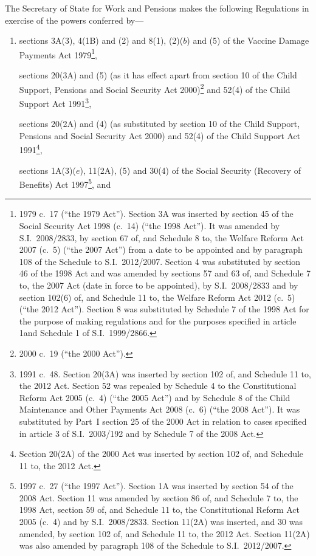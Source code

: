 \documentclass[12pt,a4paper]{article}
\title{\regstitle}
\author{S.I.\ 2013 No.\ 2380}
\date{Made
10th September 2013\\
Coming into force
28th October 2013
}
\begin{document}
\maketitle

\enlargethispage{\baselineskip}

\noindent
The Secretary of State for Work and Pensions makes the following Regulations in exercise of the powers conferred by—
\begin{enumerate}\item[]
    sections 3A(3), 4(1B) and (2) and 8(1), (2)($b$)  and (5) of the Vaccine Damage Payments Act 1979\footnote{1979 c.~17 (“the 1979 Act”). Section 3A was inserted by section 45 of the Social Security Act 1998 (c.~14) (“the 1998 Act”). It was amended by S.I.~2008/2833, by section 67 of, and Schedule 8 to, the Welfare Reform Act 2007 (c.~5) (“the 2007 Act”) from a date to be appointed and by paragraph 108 of the Schedule to S.I.~2012/2007. Section 4 was substituted by section 46 of the 1998 Act and was amended by sections 57 and 63 of, and Schedule 7 to, the 2007 Act (date in force to be appointed), by S.I.~2008/2833 and by section 102(6) of, and Schedule 11 to, the Welfare Reform Act 2012 (c.~5) (“the 2012 Act”). Section 8 was substituted by Schedule 7 of the 1998 Act for the purpose of making regulations and for the purposes specified in article 1and Schedule 1 of S.I.~1999/2866.},

    sections 20(3A) and (5) (as it has effect apart from section 10 of the Child Support, Pensions and Social Security Act 2000)\footnote{2000 c.~19 (“the 2000 Act”).} and 52(4) of the Child Support Act 1991\footnote{1991 c.~48. Section 20(3A) was inserted by section 102 of, and Schedule 11 to, the 2012 Act. Section 52 was repealed by Schedule 4 to the Constitutional Reform Act 2005 (c.~4) (“the 2005 Act”) and by Schedule 8 of the Child Maintenance and Other Payments Act 2008 (c.~6) (“the 2008 Act”). It was substituted by Part~I section 25 of the 2000 Act in relation to cases specified in article 3 of S.I.~2003/192 and by Schedule 7 of the 2008 Act.},

    sections 20(2A) and (4) (as substituted by section 10 of the Child Support, Pensions and Social Security Act 2000) and 52(4) of the Child Support Act 1991\footnote{Section 20(2A) of the 2000 Act was inserted by section 102 of, and Schedule 11 to, the 2012 Act.},

    sections 1A(3)($e$), 11(2A), (5) and 30(4) of the Social Security (Recovery of Benefits) Act 1997\footnote{1997 c.~27 (“the 1997 Act”). Section 1A was inserted by section 54 of the 2008 Act. Section 11 was amended by section 86 of, and Schedule 7 to, the 1998 Act, section 59 of, and Schedule 11 to, the Constitutional Reform Act 2005 (c.~4) and by S.I.~2008/2833. Section 11(2A) was inserted, and 30 was amended, by section 102 of, and Schedule 11 to, the 2012 Act. Section 11(2A) was also amended by paragraph 108 of the Schedule to S.I.~2012/2007.}, and


\end{enumerate}
\end{document}
